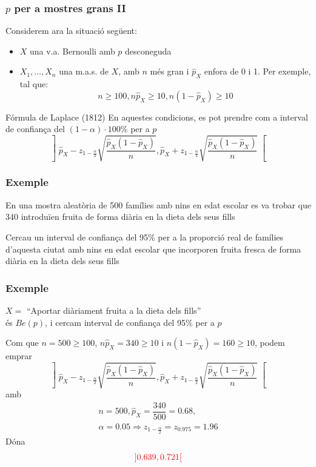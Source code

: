 \documentclass[12pt,t]{beamer}
\newcommand{\red}[1]{\textcolor{red}{#1}}
\renewcommand{\geq}{\geqslant}
\theoremstyle{plain}
\theoremstyle{definition}
\begin{document}
\begin{frame}
\frametitle{$p$ per a mostres grans II}

Considerem ara la situació següent:
\begin{itemize}
\item  $X$ una v.a. Bernoulli amb $p$ desconeguda

\item $X_1,\ldots,X_n$ una m.a.s. de $X$, amb $n$ més gran i $\widehat{p}_{X}$ enfora de 0 i 1. Per exemple, tal que:
$$
n\geq 100, n\widehat{p}_{X}\geq 10,  n(1-\widehat{p}_{X})\geq 10
$$
\end{itemize}
\medskip



\begin{block}{Fórmula de Laplace (1812)}
En aquestes condicions, es pot prendre com a interval  de confiança del $(1-\alpha)\cdot 100\%$ per a $p$
$$
\left]\widehat{p}_{X}-z_{1-\frac{\alpha}{2}}\sqrt{\frac{\widehat{p}_{X}
(1-\widehat{p}_{X})}{n}},
\widehat{p}_{X}+z_{1-\frac{\alpha}{2}}\sqrt{\frac{\widehat{p}_{X}
(1-\widehat{p}_{X})}{n}}\right[$$
\end{block}
\end{frame}



\begin{frame}
\frametitle{Exemple}

En una mostra aleatòria de 500 famílies amb nins en edat escolar es
va trobar que 340 introduïen fruita de forma diària en la dieta dels seus fills
\medskip

Cercau un interval de confiança del 95\% per a la proporció real de
famílies d'aquesta ciutat amb nins en edat escolar que incorporen fruita fresca de
forma diària en la dieta dels seus fills


\end{frame}
\begin{frame}
\frametitle{Exemple}

$X=$ ``Aportar diàriament fruita a la dieta dels fills''\\
 és $Be(p)$, i cercam interval de confiança del 95\% per a $p$
\bigskip

Com que $n=500\geq 100$, $n\widehat{p}_X=340\geq 10$ i $n(1-\widehat{p}_X)=160\geq 10$, podem emprar
$$
\left]\widehat{p}_{X}-z_{1-\frac{\alpha}{2}}\sqrt{\frac{\widehat{p}_{X}
(1-\widehat{p}_{X})}{n}},
\widehat{p}_{X}+z_{1-\frac{\alpha}{2}}\sqrt{\frac{\widehat{p}_{X}
(1-\widehat{p}_{X})}{n}}\right[
$$
amb
$$
\begin{array}{c}
n=500, \widehat{p}_{X}=\dfrac{340}{500}=0.68,\\[1ex]
 \alpha=0.05\Rightarrow z_{1-\frac{\alpha}{2}}=z_{0.975}=1.96
\end{array}
$$
Dóna 
$$
\red{]0.639,0.721[}
$$

\end{frame}
\end{document}
